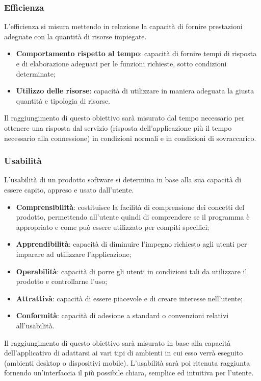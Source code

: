 \subsubsection{Efficienza}
L'efficienza si misura mettendo in relazione la capacità di fornire prestazioni adeguate con la quantità di risorse impiegate.
\begin{itemize}
	\item \textbf{Comportamento rispetto al tempo}: capacità di fornire tempi di risposta e di elaborazione adeguati per le funzioni richieste, sotto condizioni determinate;
	\item \textbf{Utilizzo delle risorse}: capacità di utilizzare in maniera adeguata la giusta quantità e tipologia di risorse.
\end{itemize}
Il raggiungimento di questo obiettivo sarà misurato dal tempo necessario per ottenere una risposta dal servizio (risposta dell'applicazione più il tempo necessario alla connessione) in condizioni normali e in condizioni di sovraccarico.
\subsubsection{Usabilità}
L'usabilità di un prodotto software si determina in base alla sua capacità di essere capito, appreso e usato dall'utente.
\begin{itemize}
	\item \textbf{Comprensibilità}: costituisce la facilità di comprensione dei concetti del prodotto, permettendo all'utente quindi di comprendere se il programma è appropriato e come può essere utilizzato per compiti specifici;
	\item \textbf{Apprendibilità}: capacità di diminuire l'impegno richiesto agli utenti per imparare ad utilizzare l'applicazione;
	\item \textbf{Operabilità}: capacità di porre gli utenti in condizioni tali da utilizzare il prodotto e controllarne l'uso;
	\item \textbf{Attrattivà}: capacità di essere piacevole e di creare interesse nell'utente;
	\item \textbf{Conformità}: capacità di adesione a standard o convenzioni relativi all'usabilità.
\end{itemize}
Il raggiungimento di questo obiettivo sarà misurato in base alla capacità dell'applicativo di adattarsi ai vari tipi di ambienti in cui esso verrà eseguito (ambienti desktop o dispositivi mobile). L'usabilità sarà poi ritenuta raggiunta fornendo un'interfaccia il più possibile chiara, semplice ed intuitiva per l'utente.
